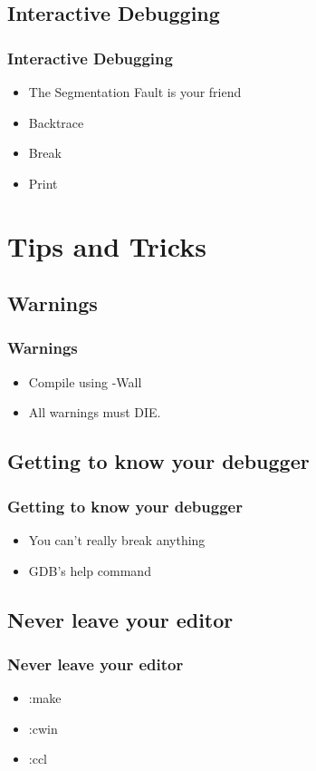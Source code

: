 \documentclass{beamer}
\begin{document}
\subsection{Interactive Debugging}
\frame
{
    \frametitle{Interactive Debugging}

    \begin{itemize}
        \item The Segmentation Fault is your friend
        \item Backtrace
        \item Break
        \item Print
    \end{itemize}
}

\section{Tips and Tricks}
\subsection{Warnings}
\frame
{
    \frametitle{Warnings}

    \begin{itemize}
        \item Compile using -Wall
        \item All warnings must DIE.
    \end{itemize}
}

\subsection{Getting to know your debugger}
\frame
{
    \frametitle{Getting to know your debugger}

    \begin{itemize}
        \item You can't really break anything
        \item GDB's help command
    \end{itemize}
}

\subsection{Never leave your editor}
\frame
{
    \frametitle{Never leave your editor}

    \begin{itemize}
        \item :make
        \item :cwin
        \item :ccl
    \end{itemize}
}
\end{document}
